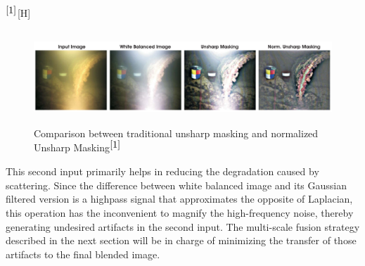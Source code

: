 \documentclass[hidelinks, 12pt]{report}
\begin{document}
$^{\cite{1}}$[H]
\begin{figure}
\centering
\includegraphics[width=15cm,height=3.5cm]{NUM.png}
\caption[Comparison between traditional Unsharp Masking and normalized Unsharp Masking]{Comparison between traditional unsharp masking and normalized Unsharp Masking$^{\cite{1}}$}
\label{Masking}
\end{figure}
This second input primarily helps in reducing the degradation caused by scattering. Since the difference between white balanced image and its Gaussian filtered version is a highpass signal that approximates the opposite of Laplacian, this operation has the inconvenient to magnify the high-frequency noise, thereby generating undesired artifacts in the second input. The multi-scale fusion strategy described in the next section will be in charge of minimizing the transfer of those artifacts to the final blended image.
\end{document}
